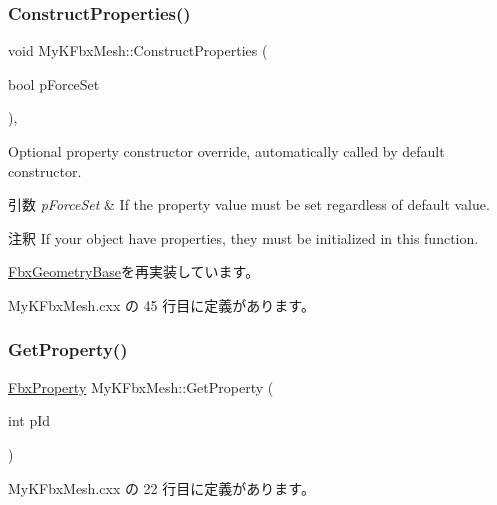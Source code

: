 \subsubsection{\texorpdfstring{Construct\+Properties()}{ConstructProperties()}}
{\footnotesize\ttfamily void My\+K\+Fbx\+Mesh\+::\+Construct\+Properties (\begin{DoxyParamCaption}\item[{bool}]{p\+Force\+Set }\end{DoxyParamCaption})\hspace{0.3cm}{\ttfamily [protected]}, {\ttfamily [virtual]}}

Optional property constructor override, automatically called by default constructor. 
\begin{DoxyParams}{引数}
{\em p\+Force\+Set} & If the property value must be set regardless of default value. \\
\hline
\end{DoxyParams}
\begin{DoxyRemark}{注釈}
If your object have properties, they must be initialized in this function. 
\end{DoxyRemark}


\hyperlink{class_fbx_geometry_base_a94ee142ac1d40be3aebb4d9441431921}{Fbx\+Geometry\+Base}を再実装しています。



 My\+K\+Fbx\+Mesh.\+cxx の 45 行目に定義があります。

\mbox{\label{class_my_k_fbx_mesh_a3f0c644f91e9d8def6c896028fa29757}} 
\subsubsection{\texorpdfstring{Get\+Property()}{GetProperty()}}
{\footnotesize\ttfamily \hyperlink{class_fbx_property}{Fbx\+Property} My\+K\+Fbx\+Mesh\+::\+Get\+Property (\begin{DoxyParamCaption}\item[{int}]{p\+Id }\end{DoxyParamCaption})}



 My\+K\+Fbx\+Mesh.\+cxx の 22 行目に定義があります。

\mbox{\label{class_my_k_fbx_mesh_a12507f999188a123a733b372ae5c0cf5}} 
